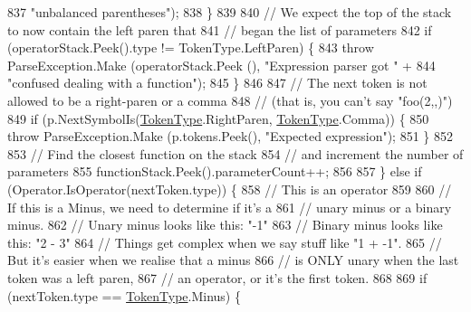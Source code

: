 \begin{DoxyCode}
837                                 \textcolor{stringliteral}{"unbalanced parentheses"});
838                         \}
839 
840                         \textcolor{comment}{// We expect the top of the stack to now contain the left paren that}
841                         \textcolor{comment}{// began the list of parameters}
842                         \textcolor{keywordflow}{if} (operatorStack.Peek().type != TokenType.LeftParen) \{
843                             \textcolor{keywordflow}{throw} ParseException.Make (operatorStack.Peek (), \textcolor{stringliteral}{"Expression parser got "} +
844                                 \textcolor{stringliteral}{"confused dealing with a function"});
845                         \}
846 
847                         \textcolor{comment}{// The next token is not allowed to be a right-paren or a comma}
848                         \textcolor{comment}{// (that is, you can't say "foo(2,,)")}
849                         \textcolor{keywordflow}{if} (p.NextSymbolIs(\hyperlink{a00051_a301aa7c866593a5b625a8fc158bbeace}{TokenType}.RightParen, 
      \hyperlink{a00051_a301aa7c866593a5b625a8fc158bbeace}{TokenType}.Comma)) \{
850                             \textcolor{keywordflow}{throw} ParseException.Make (p.tokens.Peek(), \textcolor{stringliteral}{"Expected expression"});
851                         \}
852 
853                         \textcolor{comment}{// Find the closest function on the stack}
854                         \textcolor{comment}{// and increment the number of parameters}
855                         functionStack.Peek().parameterCount++;
856 
857                     \} \textcolor{keywordflow}{else} \textcolor{keywordflow}{if} (Operator.IsOperator(nextToken.type)) \{
858                         \textcolor{comment}{// This is an operator}
859 
860                         \textcolor{comment}{// If this is a Minus, we need to determine if it's a}
861                         \textcolor{comment}{// unary minus or a binary minus.}
862                         \textcolor{comment}{// Unary minus looks like this: "-1"}
863                         \textcolor{comment}{// Binary minus looks like this: "2 - 3"}
864                         \textcolor{comment}{// Things get complex when we say stuff like "1 + -1".}
865                         \textcolor{comment}{// But it's easier when we realise that a minus}
866                         \textcolor{comment}{// is ONLY unary when the last token was a left paren,}
867                         \textcolor{comment}{// an operator, or it's the first token.}
868 
869                         \textcolor{keywordflow}{if} (nextToken.type == \hyperlink{a00051_a301aa7c866593a5b625a8fc158bbeace}{TokenType}.Minus) \{

\end{DoxyCode}
